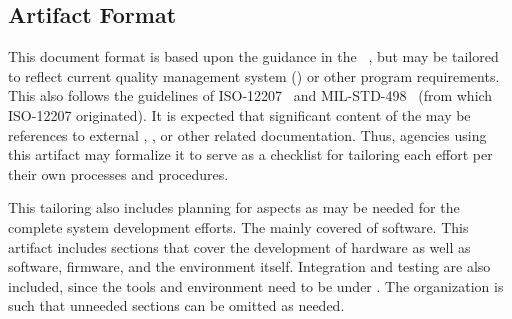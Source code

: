 
\subsection{Artifact Format}
\label{loc:DocOverview_ArtifactFormat}

This document format is based upon the guidance in the \CMPLAN \DID~\citeIEEEstdCM, but may be tailored to reflect current quality management system (\QMS) or other program requirements.
This \CMPLAN also follows the guidelines of ISO-12207~\cite{ref__ISO_12207} and MIL-STD-498~\cite{ref__MIL_STD_498} (from which ISO-12207 originated).
It is expected that significant content of the \CMPLAN may be references to external \QMS, \CMMI, or other related documentation.
Thus, agencies using this artifact may formalize it to serve as a checklist for tailoring each effort per their own processes and procedures.

This tailoring also includes planning for \CM aspects as may be needed for the complete system development efforts.
The \CMPLAN \DID mainly covered \CM of software.
This artifact includes sections that cover the development of hardware as well as software, firmware, and the environment itself.
Integration and testing are also included, since the tools and environment need to be under \CM.
The organization is such that unneeded sections can be omitted as needed.


